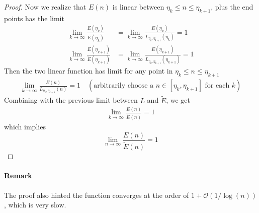 \documentclass[]{article}
\begin{document}
\begin{proof}
	Now we realize that $E(n)$ is linear between $\eta_k\le n \le \eta_{k+1}$, plus the end points has the limit
	\begin{align*}
	\lim_{k\to\infty} \frac{E(\eta_k)}{\tilde{E}(\eta_k)} &= \lim_{k\to\infty} \frac{E(\eta_k)}{L_{\eta_{k},\eta_{k+1}}(\eta_k)} = 1 \\
	\lim_{k\to\infty} \frac{E(\eta_{k+1})}{\tilde{E}(\eta_{k+1})} &= \lim_{k\to\infty} \frac{E(\eta_{k+1})}{L_{\eta_{k},\eta_{k+1}}(\eta_{k+1})} = 1
	\end{align*}
	Then the two linear function has limit for any point in $\eta_k\le n \le\eta_{k+1}$
	\begin{align*}
	\lim_{k\to\infty} \frac{E(n)}{L_{\eta_{k},\eta_{k+1}}(n)} = 1 \quad(\text{arbitrarily choose a $n\in[\eta_k,\eta_{k+1}]$ for each $k$})
	\end{align*}
	Combining with the previous limit between $L$ and $\tilde{E}$, we get
	\begin{align*}
	\lim_{k\to\infty} \frac{E(n)}{\tilde{E}(n)} = 1
	\end{align*}
	which implies
	\[
	\lim_{n\to\infty} \frac{E(n)}{\tilde{E}(n)} = 1
	\]


\end{proof}

\paragraph{Remark}

The proof also hinted the function converges at the order of $1+\mathcal{O}(1/\log(n))$, which is very slow.
\end{document}
